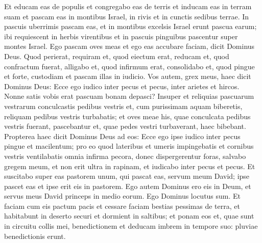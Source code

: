 \begin{biblechapter}
\begin{biblechapter}
\begin{biblechapter}
\begin{biblechapter}
\begin{biblechapter}
\begin{biblechapter}
\begin{biblechapter}
\begin{biblechapter}
\begin{biblechapter}
\begin{biblechapter}
\begin{biblechapter}
\begin{biblechapter}
\begin{biblechapter}
\begin{biblechapter}
\begin{biblechapter}
\begin{biblechapter}
\begin{biblechapter}
\begin{biblechapter}
\begin{biblechapter}
\begin{biblechapter}
\begin{biblechapter}
\begin{biblechapter}
\begin{biblechapter}
\begin{biblechapter}
\begin{biblechapter}
\begin{biblechapter}
\begin{biblechapter}
\begin{biblechapter}
\begin{biblechapter}
\begin{biblechapter}
\begin{biblechapter}
\begin{biblechapter}
\begin{biblechapter}
\begin{biblechapter}
\verse Et educam eas de populis et congregabo eas de terris et inducam eas in terram suam et pascam eas in montibus Israel, in rivis et in cunctis sedibus terrae. 
\verse In pascuis uberrimis pascam eas, et in montibus excelsis Israel erunt pascua earum; ibi requiescent in herbis virentibus et in pascuis pinguibus pascentur super montes Israel. 
\verse Ego pascam oves meas et ego eas accubare faciam, dicit Dominus Deus. 
\verse Quod perierat, requiram et, quod eiectum erat, reducam et, quod confractum fuerat, alligabo et, quod infirmum erat, consolidabo et, quod pingue et forte, custodiam et pascam illas in iudicio.
 \verse Vos autem, grex meus, haec dicit Dominus Deus: Ecce ego iudico inter pecus et pecus, inter arietes et hircos. 
\verse Nonne satis vobis erat pascuam bonam depasci? Insuper et reliquias pascuarum vestrarum conculcastis pedibus vestris et, cum purissimam aquam biberetis, reliquam pedibus vestris turbabatis; 
\verse et oves meae his, quae conculcata pedibus vestris fuerant, pascebantur et, quae pedes vestri turbaverant, haec bibebant.
 \verse Propterea haec dicit Dominus Deus ad eos: Ecce ego ipse iudico inter pecus pingue et macilentum; 
\verse pro eo quod lateribus et umeris impingebatis et cornibus vestris ventilabatis omnia infirma pecora, donec dispergerentur foras, 
\verse salvabo gregem meum, et non erit ultra in rapinam, et iudicabo inter pecus et pecus. 
\verse Et suscitabo super eas pastorem unum, qui pascat eas, servum meum David; ipse pascet eas et ipse erit eis in pastorem. 
\verse Ego autem Dominus ero eis in Deum, et servus meus David princeps in medio eorum. Ego Dominus locutus sum. 
\verse Et faciam cum eis pactum pacis et cessare faciam bestias pessimas de terra, et habitabunt in deserto securi et dormient in saltibus; 
\verse et ponam eos et, quae sunt in circuitu collis mei, benedictionem et deducam imbrem in tempore suo: pluviae benedictionis erunt. 

\end{biblechapter}
\end{biblechapter}
\end{biblechapter}
\end{biblechapter}
\end{biblechapter}
\end{biblechapter}
\end{biblechapter}
\end{biblechapter}
\end{biblechapter}
\end{biblechapter}
\end{biblechapter}
\end{biblechapter}
\end{biblechapter}
\end{biblechapter}
\end{biblechapter}
\end{biblechapter}
\end{biblechapter}
\end{biblechapter}
\end{biblechapter}
\end{biblechapter}
\end{biblechapter}
\end{biblechapter}
\end{biblechapter}
\end{biblechapter}
\end{biblechapter}
\end{biblechapter}
\end{biblechapter}
\end{biblechapter}
\end{biblechapter}
\end{biblechapter}
\end{biblechapter}
\end{biblechapter}
\end{biblechapter}
\end{biblechapter}
